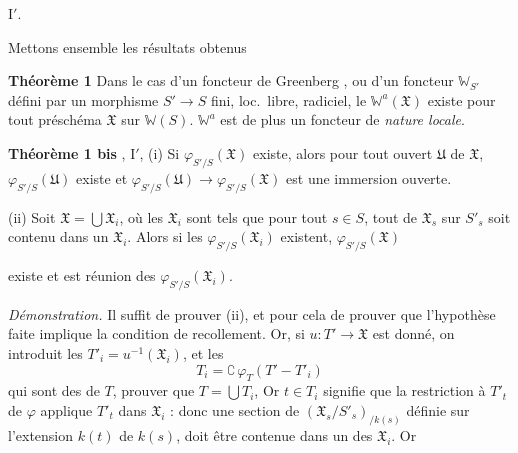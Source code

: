 \documentclass[11pt,a4paper]{article}
\begin{document}
 \ill{} \ill{} \ill{} I$'$.

Mettons ensemble les résultats obtenus

\textbf{Théorème 1} Dans le cas d'un foncteur de Greenberg
, ou d'un foncteur $\mathbb{W}_{S'}$ défini par un
morphisme $S' \to S$ fini, loc.\ libre, \struck{\ill{}} radiciel,
le $\mathbb{W}^{a}(\mathfrak{X})$ existe pour tout préschéma
$\mathfrak{X}$ sur $\mathbb{W}(S)$. \struck{\ill{}} $\mathbb{W}^{a}$ est de
plus un foncteur de \emph{nature locale}.

\textbf{Théorème 1 bis} , I$'$,
 (i) Si $\varphi_{S'/S}(\mathfrak{X})$
existe, alors pour tout ouvert $\mathfrak{U}$ de $\mathfrak{X}$,
$\varphi_{S'/S}(\mathfrak{U})$ existe et $\varphi_{S'/S}(\mathfrak{U}) \to
\varphi_{S'/S}(\mathfrak{X})$ est une immersion ouverte.

(ii) Soit $\mathfrak{X} = \bigcup \mathfrak{X}_i$, où les $\mathfrak{X}_i$
sont tels que pour tout $s \in S$, tout \struck{\ill{}} \add{\ill{} \ill{}}
de $\mathfrak{X}_s$ sur $S'_s$ soit contenu dans un $\mathfrak{X}_i$.
Alors si les $\varphi_{S'/S}(\mathfrak{X}_i)$ existent,
$\varphi_{S'/S}(\mathfrak{X})$

existe et est réunion des $\varphi_{S'/S}(\mathfrak{X}_i)$.

\textit{Démonstration.} Il suffit de prouver (ii), et pour cela de prouver
que l'hypothèse faite implique la condition de recollement. Or,
si $u\colon T' \to \mathfrak{X}$ est donné, on introduit les
$T'_i = u^{-1}(\mathfrak{X}_i)$, \struck{\ill{}} et les
\[
  T_i = \complement\, \varphi_{T}(T' - T'_i)
\]
qui sont des  de $T$, \ill{} \ill{} prouver que
$T = \bigcup T_i$,  Or $t \in T_i$ signifie que
la restriction à $T'_t$ de $\varphi$ applique $T'_t$ dans
$\mathfrak{X}_i$ : donc une section de $(\mathfrak{X}_s/S'_s)_{/k(s)}$
définie sur l'extension $k(t)$ de $k(s)$, doit être
contenue dans un des $\mathfrak{X}_i$. Or
  
\end{document}

